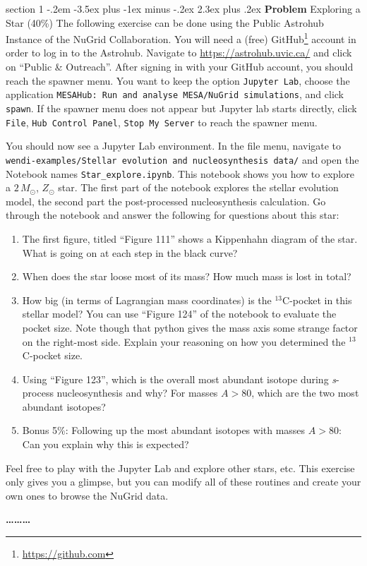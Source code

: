 \documentclass[letterpaper,12pt,twoside=false,DIV=11]{scrartcl}
\makeatletter
\newenvironment{problem}{\@startsection
    {section}
    {1}
    {-.2em}
    {-3.5ex plus -1ex minus -.2ex}
    {2.3ex plus .2ex}
    {
        \pagebreak[3] %
        \noindent\sffamily\bfseries Problem
    }
}
{
    \begin{center}\large\bfseries\ldots\ldots\ldots\end{center}
}
\providecommand{\ex}[1]{\ensuremath{^{#1}}}
\makeatother
\begin{document}
\begin{problem}{Exploring a Star (40\%)}
The following exercise can be done using the Public Astrohub Instance of the NuGrid Collaboration. You will need a (free) GitHub\footnote{\url{https://github.com}} account in order to log in to the Astrohub. 
Navigate to \url{https://astrohub.uvic.ca/} and click on ``Public \& Outreach''. After signing in with your GitHub account, you should reach the spawner menu. You want to keep the option \texttt{Jupyter Lab}, choose the application \texttt{MESAHub: Run and analyse MESA/NuGrid simulations}, and click \texttt{spawn}. If the spawner menu does not appear but Jupyter lab starts directly, click \texttt{File}, \texttt{Hub Control Panel}, \texttt{Stop My Server} to reach the spawner menu. 

You should now see a Jupyter Lab environment. In the file menu, navigate to \texttt{wendi-examples/Stellar evolution and nucleosynthesis data/} and open the Notebook names \texttt{Star\_explore.ipynb}. This notebook shows you how to explore a $2\,M_\odot$, $Z_\odot$ star. The first part of the notebook explores the stellar evolution model, the second part the post-processed nucleosynthesis calculation. Go through the notebook and answer the following for questions about this star:
\begin{enumerate}
    \item The first figure, titled ``Figure 111'' shows a Kippenhahn diagram of the star. What is going on at each step in the black curve? 
    \item When does the star loose most of its mass? How much mass is lost in total?
    \item How big (in terms of Lagrangian mass coordinates) is the \ex{13}C-pocket in this stellar model? You can use ``Figure 124'' of the notebook to evaluate the pocket size. Note though that python gives the mass axis some strange factor on the right-most side. Explain your reasoning on how you determined the \ex{13}C-pocket size.
    \item Using ``Figure 123'', which is the overall most abundant isotope during \textit{s}-process nucleosynthesis and why? For masses $A>80$, which are the two most abundant isotopes? 
    \item Bonus 5\%: Following up the most abundant isotopes with masses $A>80$: Can you explain why this is expected?
\end{enumerate}

Feel free to play with the Jupyter Lab and explore other stars, etc. This exercise only gives you a glimpse, but you can modify all of these routines and create your own ones to browse the NuGrid data.
\end{problem}
\end{document}
